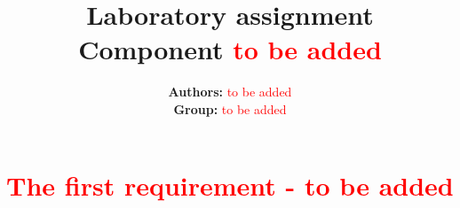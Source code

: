 \documentclass[a4paper, 11pt]{article}
\title{\textbf{Laboratory assignment} \\[1ex] \large \textbf{Component} \textcolor{red}{to be added}}
\author{\textbf{Authors:} \textcolor{red}{to be added}\\ \textbf{Group:} \textcolor{red}{to be added}}
\begin{document}
\maketitle

\section{\textcolor{red}{The first requirement - to be added}}


\cite{2018_Dafonte}



\end{document}
